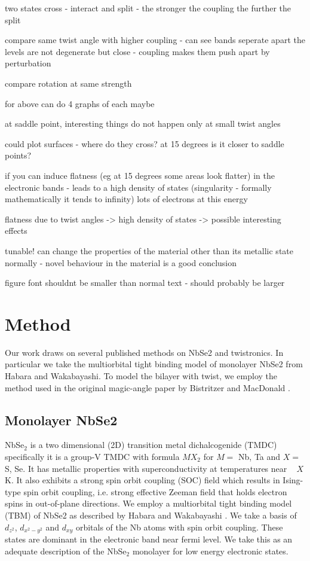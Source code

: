 \documentclass[12pt]{report} %
\begin{document}
  two states cross - interact and split - the stronger the coupling the further the split

 compare same twist angle with higher coupling - can see  bands seperate apart the levels are not degenerate but close - coupling makes them push apart by perturbation

 compare rotation at same strength 

 for above can do 4 graphs of each maybe

 at saddle point, interesting things do not happen only at small twist angles

  could plot surfaces - where do they cross? at 15 degrees is it closer to saddle points?

if you can induce flatness (eg at 15 degrees some areas look flatter) in the electronic bands - leads to a high density of states (singularity - formally mathematically it tends to infinity) lots of electrons at this energy

flatness due to twist angles -> high density of states -> possible interesting effects

tunable! can change the properties of the material other than its metallic state normally - novel behaviour in the material is a good conclusion


figure font shouldnt be smaller than normal text - should probably be larger


\section*{Method}
  Our work draws on several published methods on NbSe2 and twistronics. In particular we take the multiorbital tight binding model of monolayer NbSe2 from Habara and Wakabayashi\cite{Habara2021}. To model the bilayer with twist, we employ the method used in the original magic-angle paper by Bistritzer and MacDonald \cite{Bistritzer2011}. 

\subsection*{Monolayer NbSe2}
  NbSe$_2$ is a two dimensional (2D) transition metal dichalcogenide (TMDC) specifically it is a group-V TMDC with formula $MX_2$ for $M =$ Nb, Ta and $X =$ S, Se. It has metallic properties with superconductivity at temperatures near ~ $X$ K. It also exhibits a strong spin orbit coupling (SOC) field which results in Ising-type spin orbit coupling, i.e. strong effective Zeeman field that holds electron spins in out-of-plane directions. We employ a multiorbital tight binding model (TBM) of NbSe2 as described by Habara and Wakabayashi \cite{Habara2021}. We take a basis of $d_{z^2}$, $d_{x^2 - y^2}$ and $d_{xy}$ orbitals of the Nb atoms with spin orbit coupling. These states are dominant in the electronic band near fermi level. We take this as an adequate description of the NbSe$_2$ monolayer for low energy electronic states.
\end{document}
